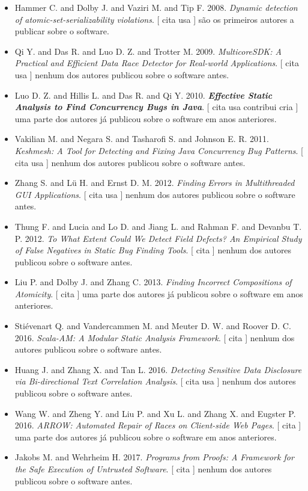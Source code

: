 \begin{itemize}
\item Hammer C. and Dolby J. and Vaziri M. and Tip F.
      2008.
        \textit{ Dynamic detection of atomic-set-serializability violations}.
      [
          cita
          usa
      ]
são os primeiros autores a publicar sobre o software.
\item Qi Y. and Das R. and Luo D. Z. and Trotter M.
      2009.
        \textit{ MulticoreSDK: A Practical and Efficient Data Race Detector for Real-world Applications}.
      [
          cita
          usa
      ]
nenhum dos autores publicou sobre o software antes.
\item Luo D. Z. and Hillis L. and Das R. and Qi Y.
      2010.
        \textbf{\textit{ Effective Static Analysis to Find Concurrency Bugs in Java}}.
      [
          cita
          usa
          contribui
          cria
      ]
uma parte dos autores já publicou sobre o software em anos anteriores.
\item Vakilian M. and Negara S. and Tasharofi S. and Johnson E. R.
      2011.
        \textit{ Keshmesh: A Tool for Detecting and Fixing Java Concurrency Bug Patterns}.
      [
          cita
          usa
      ]
nenhum dos autores publicou sobre o software antes.
\item Zhang S. and L\"{u} H. and Ernst D. M.
      2012.
        \textit{ Finding Errors in Multithreaded GUI Applications}.
      [
          cita
          usa
      ]
nenhum dos autores publicou sobre o software antes.
\item Thung F. and Lucia and Lo D. and Jiang L. and Rahman F. and Devanbu T. P.
      2012.
        \textit{ To What Extent Could We Detect Field Defects? An Empirical Study of False Negatives in Static Bug Finding Tools}.
      [
          cita
      ]
nenhum dos autores publicou sobre o software antes.
\item Liu P. and Dolby J. and Zhang C.
      2013.
        \textit{ Finding Incorrect Compositions of Atomicity}.
      [
          cita
      ]
uma parte dos autores já publicou sobre o software em anos anteriores.
\item Stiévenart Q. and Vandercammen M. and Meuter D. W. and Roover D. C.
      2016.
        \textit{ Scala-AM: A Modular Static Analysis Framework}.
      [
          cita
      ]
nenhum dos autores publicou sobre o software antes.
\item Huang J. and Zhang X. and Tan L.
      2016.
        \textit{ Detecting Sensitive Data Disclosure via Bi-directional Text Correlation Analysis}.
      [
          cita
          usa
      ]
nenhum dos autores publicou sobre o software antes.
\item Wang W. and Zheng Y. and Liu P. and Xu L. and Zhang X. and Eugster P.
      2016.
        \textit{ ARROW: Automated Repair of Races on Client-side Web Pages}.
      [
          cita
      ]
uma parte dos autores já publicou sobre o software em anos anteriores.
\item Jakobs M. and Wehrheim H.
      2017.
        \textit{ Programs from Proofs: A Framework for the Safe Execution of Untrusted Software}.
      [
          cita
      ]
nenhum dos autores publicou sobre o software antes.
\end{itemize}
